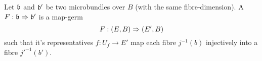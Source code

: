 \begin{mydefinition}
    Let $\mathfrak{b}$ and $\mathfrak{b}'$ be two microbundles over $B$ (with the same fibre-dimension).
    A  $F: \mathfrak{b} \Rightarrow \mathfrak{b}'$ is a map-germ
    \[ F: (E, B) \Rightarrow (E', B) \]
    such that it's representatives $f: U_f \to E'$ map each fibre $j^{-1}(b)$ injectively into a fibre $j'^{-1}(b')$.
\end{mydefinition}